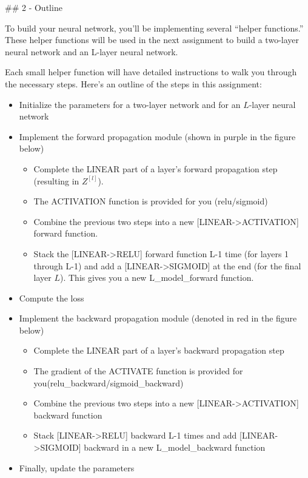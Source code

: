 \documentclass[11pt]{article}
\providecommand{\tightlist}{%
      \setlength{\itemsep}{0pt}\setlength{\parskip}{0pt}}
\begin{document}
    \#\# 2 - Outline

To build your neural network, you'll be implementing several ``helper
functions.'' These helper functions will be used in the next assignment
to build a two-layer neural network and an L-layer neural network.

Each small helper function will have detailed instructions to walk you
through the necessary steps. Here's an outline of the steps in this
assignment:

\begin{itemize}
\tightlist
\item
  Initialize the parameters for a two-layer network and for an
  \(L\)-layer neural network
\item
  Implement the forward propagation module (shown in purple in the
  figure below)

  \begin{itemize}
  \tightlist
  \item
    Complete the LINEAR part of a layer's forward propagation step
    (resulting in \(Z^{[l]}\)).
  \item
    The ACTIVATION function is provided for you (relu/sigmoid)
  \item
    Combine the previous two steps into a new
    {[}LINEAR-\textgreater ACTIVATION{]} forward function.
  \item
    Stack the {[}LINEAR-\textgreater RELU{]} forward function L-1 time
    (for layers 1 through L-1) and add a
    {[}LINEAR-\textgreater SIGMOID{]} at the end (for the final layer
    \(L\)). This gives you a new L\_model\_forward function.
  \end{itemize}
\item
  Compute the loss
\item
  Implement the backward propagation module (denoted in red in the
  figure below)

  \begin{itemize}
  \tightlist
  \item
    Complete the LINEAR part of a layer's backward propagation step
  \item
    The gradient of the ACTIVATE function is provided for
    you(relu\_backward/sigmoid\_backward)
  \item
    Combine the previous two steps into a new
    {[}LINEAR-\textgreater ACTIVATION{]} backward function
  \item
    Stack {[}LINEAR-\textgreater RELU{]} backward L-1 times and add
    {[}LINEAR-\textgreater SIGMOID{]} backward in a new
    L\_model\_backward function
  \end{itemize}
\item
  Finally, update the parameters
\end{itemize}
\end{document}
